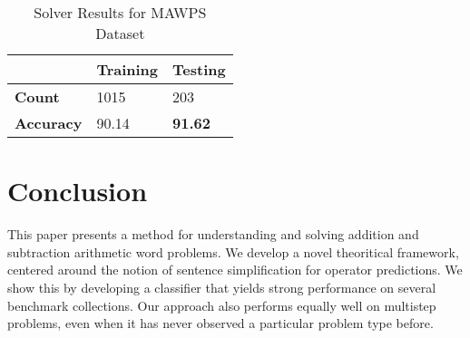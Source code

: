\documentclass[11pt]{article}
\begin{document}
\begin{table}[H]
\centering
\begin{tabular}{|m{3cm}|m{2cm}|m{2cm}|}
\hline
 & \textbf{Training} & \textbf{Testing} \\ \hline
 \textbf{Count} & 1015 & 203 \\ \hline
 \textbf{Accuracy} & 90.14 & \textbf{91.62} \\ \hline
\end{tabular}
\caption{Solver Results for MAWPS Dataset}
\label{figure:14}
\end{table}

\section{Conclusion}\label{sec:conclusion}
This paper presents a method for understanding and solving addition and subtraction arithmetic word problems. We develop a novel theoritical framework, centered around the notion of sentence simplification for operator predictions. We show this by developing a classifier that yields strong performance on several benchmark collections. Our approach also performs equally well on multistep problems, even when it has never observed a particular problem type before.



\end{document}
